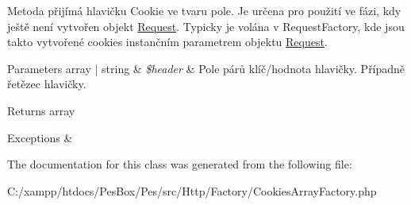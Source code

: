 Metoda přijímá hlavičku \textquotesingle{}Cookie\textquotesingle{} ve tvaru pole. Je určena pro použití ve fázi, kdy ještě není vytvořen objekt \mbox{\hyperlink{class_pes_1_1_http_1_1_request}{Request}}. Typicky je volána v Request\+Factory, kde jsou takto vytvořené cookies instančním parametrem objektu \mbox{\hyperlink{class_pes_1_1_http_1_1_request}{Request}}. 
\begin{DoxyParams}[1]{Parameters}
array | string & {\em \$header} & Pole párů klíč/hodnota hlavičky. Případně řetězec hlavičky. \\
\hline
\end{DoxyParams}
\begin{DoxyReturn}{Returns}
array 
\end{DoxyReturn}

\begin{DoxyExceptions}{Exceptions}
{\em } & \\
\hline
\end{DoxyExceptions}


The documentation for this class was generated from the following file\+:\begin{DoxyCompactItemize}
\item 
C\+:/xampp/htdocs/\+Pes\+Box/\+Pes/src/\+Http/\+Factory/Cookies\+Array\+Factory.\+php\end{DoxyCompactItemize}
